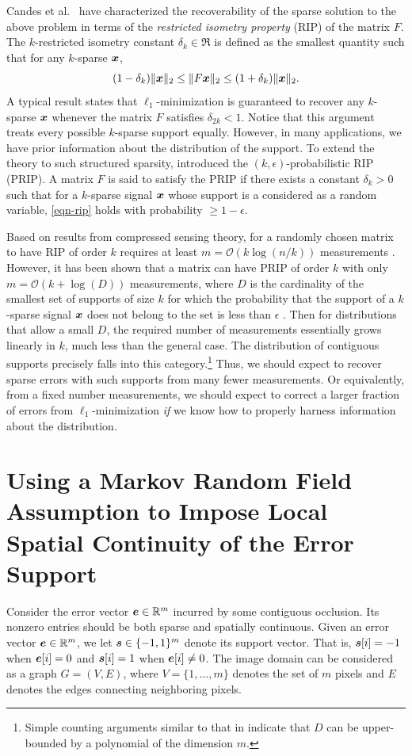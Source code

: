 Candes et al.\ \cite{CandesE2005-IT} have characterized the recoverability of the sparse solution to the above problem in terms of the {\em restricted isometry property} (RIP) of the matrix $F$.
The $k$-restricted isometry constant $\delta_k \in \Re$ is defined as the smallest
quantity such that for any $k$-sparse ${\boldsymbol{x}}$,
\begin{equation}
(1-\delta_k)\|{\boldsymbol{x}}\|_2 \leq \|F{\boldsymbol{x}}\|_2 \leq (1+\delta_k)\|{\boldsymbol{x}}\|_2.
\label{eqn-rip}
\end{equation}
A typical result states that $\ell_1$-minimization is guaranteed to recover any $k$-sparse ${\boldsymbol{x}}$ whenever the matrix
$F$ satisfies $\delta_{2k}<1$. Notice that this argument treats every
possible $k$-sparse support equally. However, in many
applications, we have prior information about the
distribution of the support. To extend the theory to such
structured sparsity, \cite{Cevher2008-NIPS} introduced the
$(k,\epsilon)$-probabilistic RIP (PRIP). A matrix $F$ is said to
satisfy the PRIP if there exists a constant $\delta_k>0$ such that
for a $k$-sparse signal ${\boldsymbol{x}}$ whose support is a considered as a random variable, \eqref{eqn-rip} holds with probability $\ge 1-\epsilon$.

Based on results from compressed sensing theory, for a randomly chosen matrix to have RIP of order $k$ requires at least $m =\mathcal{O}(k\log(n/k))$ measurements \cite{CandesE2005-IT}. However, it has been shown that a matrix can have PRIP of order $k$ with only $m =\mathcal {O}(k + \log(D))$ measurements, where $D$ is the cardinality of the smallest set of supports of size $k$ for which the probability that the support of a $k$-sparse signal ${\boldsymbol{x}}$ does not belong to the set is less than $\epsilon$ \cite{Cevher2008-NIPS}. Then for distributions that allow a small $D$, the required number of measurements essentially grows linearly in $k$, much less than the general case. The distribution of contiguous supports precisely falls into this category.\footnote{Simple counting arguments similar to that in \cite{Cevher2008-NIPS} indicate that $D$ can be upper-bounded by a polynomial of the dimension $m$.} Thus, we should expect to recover sparse errors with such supports from many fewer measurements. Or equivalently, from a fixed number measurements, we should expect to correct a larger fraction of errors from $\ell_1$-minimization {\em if} we know how to properly harness information about the distribution.

\section{Using a Markov Random Field Assumption to Impose Local Spatial Continuity of the Error Support}
Consider the error vector $\boldsymbol{e}\in \mathbb R^m$ incurred by some contiguous occlusion. Its nonzero entries should be both sparse and spatially continuous. Given an error vector $\boldsymbol{e}\in \mathbb R^m$, we let $\boldsymbol{s}\in \{-1,1\}^m$ denote its
support vector. That is, $\boldsymbol{s}[i] = -1$ when $\boldsymbol{e}[i] = 0$ and $\boldsymbol{s}[i] = 1$
when $\boldsymbol{e}[i] \neq 0$. The image domain can be considered as a graph
$G=(V,E)$, where $V = \{1,\dots,m\}$ denotes the set of $m$
pixels and $E$ denotes the edges connecting neighboring pixels.

